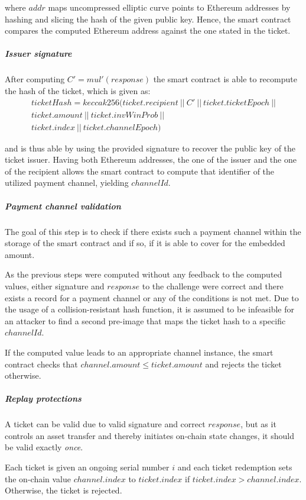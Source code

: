 where $addr$ maps uncompressed elliptic curve points to Ethereum addresses by hashing and slicing the hash of the given public key. Hence, the smart contract compares the computed Ethereum address against the one stated in the ticket.

\subparagraph{Issuer signature}

After computing $C' = mul'(response)$ the smart contract is able to recompute the hash of the ticket, which is given as:
\begin{multline*}
    ticketHash = keccak256 (ticket.recipient \ || \ C' \ || \ ticket.ticketEpoch \ ||  \\
    ticket.amount \ || \ ticket.invWinProb \ || \\
    ticket.index \ || \ ticket.channelEpoch)
\end{multline*}

and is thus able by using the provided signature to recover the public key of the ticket issuer. Having both Ethereum addresses, the one of the issuer and the one of the recipient allows the smart contract to compute that identifier of the utilized payment channel, yielding $channelId$.

\subparagraph{Payment channel validation}

The goal of this step is to check if there exists such a payment channel within the storage of the smart contract and if so, if it is able to cover for the embedded amount.

As the previous steps were computed without any feedback to the computed values, either signature and $response$ to the challenge were correct and there exists a record for a payment channel or any of the conditions is not met. Due to the usage of a collision-resistant hash function, it is assumed to be infeasible for an attacker to find a second pre-image that maps the ticket hash to a specific $channelId$.

If the computed value leads to an appropriate channel instance, the smart contract checks that $channel.amount \le ticket.amount$ and rejects the ticket otherwise.

\subparagraph{Replay protections}

A ticket can be valid due to valid signature and correct $response$, but as it controls an asset transfer and thereby initiates on-chain state changes, it should be valid exactly \textit{once}.

Each ticket is given an ongoing serial number $i$ and each ticket redemption sets the on-chain value $channel.index$ to $ticket.index$ if $ticket.index > channel.index$. Otherwise, the ticket is rejected.

